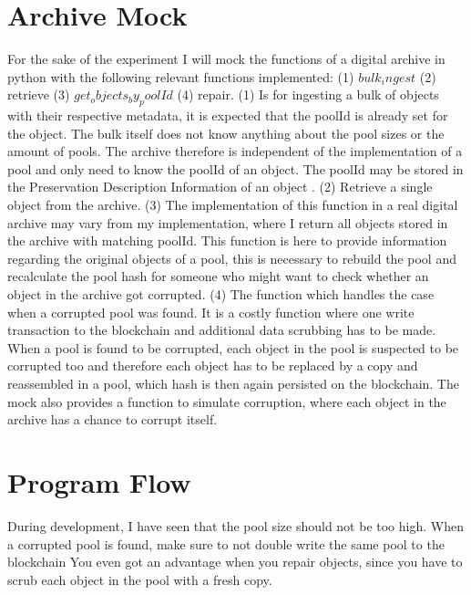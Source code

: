 \section{Archive Mock}
For the sake of the experiment I will mock the functions of a digital archive in python with the following relevant functions implemented: (1) $bulk_ingest$ (2) retrieve (3) $get_objects_by_poolId$ (4) repair. (1) Is for ingesting a bulk of objects with their respective metadata, it is expected that the poolId is already set for the object. The bulk itself does not know anything about the pool sizes or the amount of pools. The archive therefore is independent of the implementation of a pool and only need to know the poolId of an object. The poolId may be stored in the Preservation Description Information of an object \cite{lee2010open}. (2) Retrieve a single object from the archive. (3) The implementation of this function in a real digital archive may vary from my implementation, where I return all objects stored in the archive with matching poolId. This function is here to provide information regarding the original objects of a pool, this is necessary to rebuild the pool and recalculate the pool hash for someone who might want to check whether an object in the archive got corrupted. (4) The function which handles the case when a corrupted pool was found. It is a costly function where one write transaction to the blockchain and additional data scrubbing has to be made. When a pool is found to be corrupted, each object in the pool is suspected to be corrupted too and therefore each object has to be replaced by a copy and reassembled in a pool, which hash is then again persisted on the blockchain.
The mock also provides a function to simulate corruption, where each object in the archive has a chance to corrupt itself.
\section{Program Flow}
During development, I have seen that the pool size should not be too high.
When a corrupted pool is found, make sure to not double write the same pool to the blockchain
You even got an advantage when you repair objects, since you have to scrub each object in the pool with a fresh copy.
